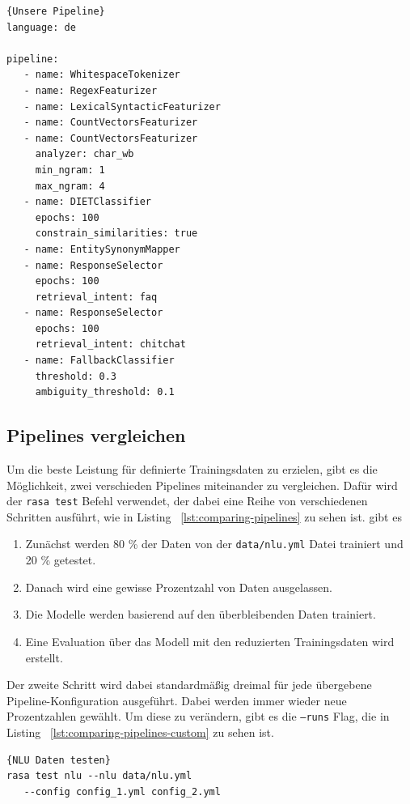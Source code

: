 \begin{lstlisting}[label={lst:our-pipeline},caption={Unsere Pipeline}]{Unsere Pipeline}
language: de

pipeline:
   - name: WhitespaceTokenizer
   - name: RegexFeaturizer
   - name: LexicalSyntacticFeaturizer
   - name: CountVectorsFeaturizer
   - name: CountVectorsFeaturizer
     analyzer: char_wb
     min_ngram: 1
     max_ngram: 4
   - name: DIETClassifier
     epochs: 100
     constrain_similarities: true
   - name: EntitySynonymMapper
   - name: ResponseSelector
     epochs: 100
     retrieval_intent: faq
   - name: ResponseSelector
     epochs: 100
     retrieval_intent: chitchat
   - name: FallbackClassifier
     threshold: 0.3
     ambiguity_threshold: 0.1
\end{lstlisting}

\subsection{Pipelines vergleichen}\label{subsec:comparing-pipelines}

Um die beste Leistung für definierte Trainingsdaten zu erzielen, gibt es die Möglichkeit, zwei verschieden Pipelines miteinander zu vergleichen.
Dafür wird der \texttt{rasa test} Befehl verwendet, der dabei eine Reihe von verschiedenen Schritten ausführt, wie in Listing ~\ref{lst:comparing-pipelines} zu sehen ist.
gibt es
\begin{enumerate}
    \item Zunächst werden 80 \% der Daten von der \texttt{data/nlu.yml} Datei trainiert und 20 \% getestet.
    \item Danach wird eine gewisse Prozentzahl von Daten ausgelassen.
    \item Die Modelle werden basierend auf den überbleibenden Daten trainiert.
    \item Eine Evaluation über das Modell mit den reduzierten Trainingsdaten wird erstellt.\cite{comparingNLUPipelines}
\end{enumerate}

Der zweite Schritt wird dabei standardmäßig dreimal für jede übergebene Pipeline-Konfiguration ausgeführt.
Dabei werden immer wieder neue Prozentzahlen gewählt.
Um diese zu verändern, gibt es die \texttt{--runs} Flag, die in Listing ~\ref{lst:comparing-pipelines-custom} zu sehen ist.\cite{comparingNLUPipelines}

\begin{lstlisting}[label={lst:comparing-pipelines},caption={NLU Daten testen}]{NLU Daten testen}
rasa test nlu --nlu data/nlu.yml
   --config config_1.yml config_2.yml
\end{lstlisting}

